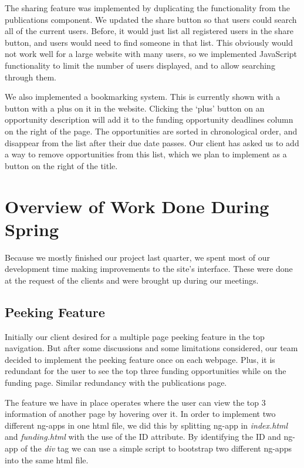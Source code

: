 \documentclass[onecolumn]{IEEEtran}
\begin{document}
The sharing feature was implemented by duplicating the functionality from the publications component. We updated the share button so that users could search all of the current users. Before, it would just list all registered users in the share button, and users would need to find someone in that list. This obviously would not work well for a large website with many users, so we implemented JavaScript functionality to limit the number of users displayed, and to allow searching through them. 

We also implemented a bookmarking system. This is currently shown with a button with a plus on it in the website. Clicking the `plus' button on an opportunity description will add it to the funding opportunity deadlines column on the right of the page. The opportunities are sorted in chronological order, and disappear from the list after their due date passes. Our client has asked us to add a way to remove opportunities from this list, which we plan to implement as a button on the right of the title.

\section{Overview of Work Done During Spring}
Because we mostly finished our project last quarter, we spent most of our development time making improvements to the site's interface. These were done at the request of the clients and were brought up during our meetings.

\subsection{Peeking Feature}
Initially our client desired for a multiple page peeking feature in the top navigation. But after some discussions and some limitations considered, our team decided to implement the peeking feature once on each webpage. Plus, it is redundant for the user to see the top three funding opportunities while on the funding page. Similar redundancy with the publications page. 

The feature we have in place operates where the user can view the top 3 information of another page by hovering over it. In order to implement two different ng-apps in one html file, we did this by splitting ng-app in \textit{index.html} and \textit{funding.html} with the use of the ID attribute. By identifying the ID and ng-app of the \textit{div} tag we can use a simple script to bootstrap two different ng-apps into the same html file. 
\end{document}
